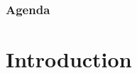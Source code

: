 
\def\PresTitle{Angular Measurement}  %
\def\PresSubtitle{Gauges and Measurement}         %
\def\PresAuthor{Brad Peirson}               %
\def\PresInstitute{College of Information Technology and Engineering}       %
\def\PresDate{}                             %
\def\PresKeywords{}                         %





\maketitle              %

\begin{frame}
    \frametitle{Agenda}
    \begingroup
        \setlength{\parskip}{0.3em} 
        
        
        \setcounter{tocdepth}{1} %
    \tableofcontents
    \setcounter{tocdepth}{2} %
    \endgroup
\end{frame}

\section{Introduction}


